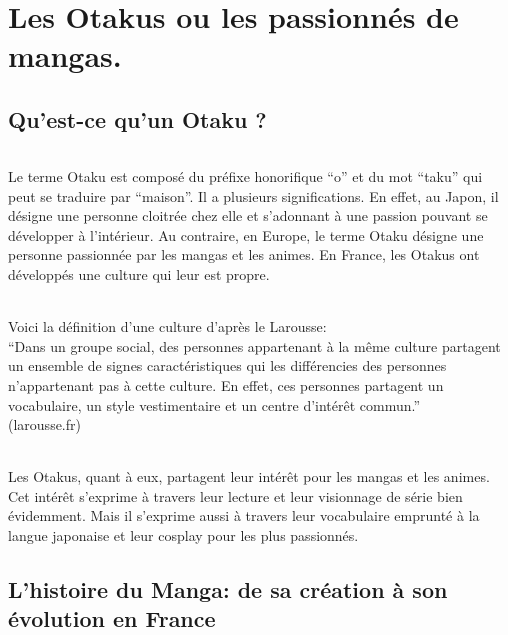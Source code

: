 \part{Les Otakus ou les passionnés de mangas.}

\chapter{Qu'est-ce qu'un Otaku ?}

\paragraph{} Le terme Otaku est composé du préfixe honorifique ``o'' et du mot
``taku'' qui peut se traduire par ``maison''. Il a plusieurs significations. En
effet, au Japon, il désigne une personne cloitrée chez elle et s'adonnant à une
passion pouvant se développer à l'intérieur. Au contraire, en Europe, le terme
Otaku désigne une personne passionnée par les mangas et les animes. En France,
les Otakus ont développés une culture qui leur est propre.

\paragraph{} Voici la définition d'une culture d'après le Larousse:\\
``Dans un groupe social, des personnes appartenant à la même
culture partagent un ensemble de signes caractéristiques qui les différencies
des personnes n'appartenant pas à cette culture. En effet, ces personnes
partagent un vocabulaire, un style vestimentaire et un centre d'intérêt
commun.''\\
(larousse.fr)

\paragraph{} Les Otakus, quant à eux, partagent leur intérêt pour les mangas et
les animes. Cet intérêt s'exprime à travers leur lecture et leur visionnage de
série bien évidemment. Mais il s'exprime aussi à travers leur vocabulaire
emprunté à la langue japonaise et leur cosplay pour les plus passionnés.

\chapter[L'histoire du Manga]{L'histoire du Manga: de sa création à son évolution en France}

